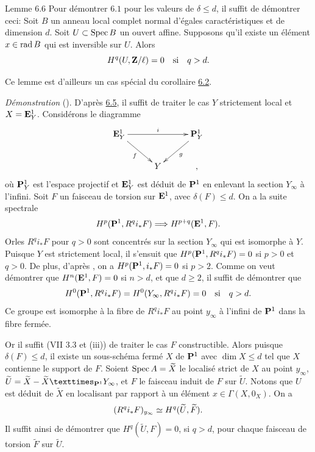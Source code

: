 \documentclass[10pt]{../fichiers-configuration-latex/smfart}
\begin{document}
\begin{enonce*}{Lemme 6.6}
Pour démontrer $6.1$ pour les valeurs de $\delta\leq d$, il suffit de
démontrer ceci: Soit $B$ un anneau local complet normal d'égales
caractéristiques et de dimension $d$. Soit $U\subset \operatorname{Spec} B$ un
ouvert affine. Supposons qu'il existe un élément $x\in \operatorname{rad} B$ qui est
inversible sur $U$. Alors
$$
H^{q}(U,\mathbf{Z}/\ell)=0\quad\text{\rm si}\quad q>d{}.
$$
\end{enonce*}

Ce lemme est d'ailleurs un cas spécial du corollaire \hyperref[XIX.cor6.2]{6.2}.

\medskip
\noindent
\emph{Démonstration} (\cf {}). D'après \hyperref[XIX.lem6.5]{6.5},
il suffit de traiter le cas $Y$ strictement local et
$X=\mathbf{E}^{1}_{Y}$. Considérons le diagramme
$$
\xymatrix@C=1cm@R=.8cm{
\EE^{1}_Y \ar[rr]^{i} \ar[rd]_{f}&   & \PP^{1}_Y \ar[ld]^{g}\\
          & Y &,
}
$$
où $\mathbf{P}^{1}_{Y}$ est l'espace projectif et $\mathbf{E}^{1}_{Y}$
est déduit de $\mathbf{P}^{1}$ en enlevant la section $Y_{\infty}$ à
l'infini. Soit $F$ un faisceau de torsion sur $\mathbf{E}^{1}$, avec
$\delta(F)\leq d$. On a la suite spectrale 
$$
H^{p}(\mathbf{P}^{1},R^{q}i_{\ast}F)\Longrightarrow
H^{p+q}(\mathbf{E}^{1},F){}.
$$
Or\pageoriginale les $R^{q}i_{\ast}F$ pour $q>0$ sont concentrés sur
la section $Y_{\infty}$ qui est isomorphe à $Y$. Puisque $Y$ est
strictement local, il s'ensuit que $H^{p}(\mathbf{P}^{1},
R^{q}i_{\ast}F)=0$ si $p>0$ et $q>0$. De plus, d'après , on a
$H^{p}(\mathbf{P}^{1}, i_{\ast}F)=0$ si $p>2$. Comme on veut démontrer
que $H^{n}(\mathbf{E}^{1},F)=0$ si $n>d$, et que $d\geq 2$, il suffit
de démontrer que
$$
H^{0}(\mathbf{P}^{1},
R^{q}i_{\ast}F)=H^{0}(Y_{\infty},R^{q}i_{\ast}F)=0\quad\text{\rm
si}\quad q>d{}.
$$
Ce groupe est isomorphe à la fibre de $R^{q}i_{\ast}F$ au point
$y_{\infty}$ à l'infini de $\mathbf{P}^{1}$ dans la fibre fermée.

Or il suffit (VII 3.3 et  (iii)) de traiter le cas $F$
constructible. Alors puisque $\delta(F)\leq d$, il existe un
sous-schéma fermé $X$ de $\mathbf{P}^{1}$ avec $\dim X\leq d$ tel que
$X$ contienne le support de $F$. Soient $\operatorname{Spec} A=\widetilde{X}$ le
localisé strict de $X$ au point $y_{\infty}$,
$\widetilde{U}=\widetilde{X}-\fprod{\widetilde{X}}{Y_{\infty}}{\PP^{1}}$,
et $F$ le faisceau induit de $F$ sur $\widetilde{U}$. Notons que $U$
est déduit de $\widetilde{X}$ en localisant par rapport à un élément
$x\in \Gamma(X,0_{X})$. On a
$$
(R^{q}i_{\ast}F)_{y_{\infty}}\simeq
H^{q}(\widetilde{U},\widetilde{F}){}.
$$
Il suffit ainsi de démontrer que $H^{q}(\widetilde{U},F)=0$, si $q>d$,
pour chaque faisceau de torsion $\widetilde{F}$ sur $\widetilde{U}$.
\end{document}
